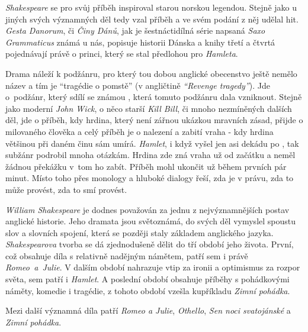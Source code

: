 \documentclass[../main.tex]{subfiles}
\begin{document}
\noindent
\textit{Shakespeare} se pro svůj příběh inspiroval starou norskou legendou.
Stejně jako u jiných svých významných děl tedy vzal příběh a ve svém podání z něj udělal hit.
\textit{Gesta Danorum}, či \textit{Činy Dánů}, jak je šestnáctidílná série napsaná \textit{Saxo Grammaticus} známá u nás, popisuje historii Dánska a knihy třetí a čtvrtá pojednávají právě o princi, který se stal předlohou pro \textit{Hamleta}.

\noindent
Drama náleží k podžánru, pro který tou dobou anglické obecenstvo ještě nemělo název a tím je \enquote{tragédie o pomstě} (v angličtině \textit{\enquote{Revenge tragedy}}).
Jde o~podžánr, který sdílí se známou , která tomuto podžánru dala vzniknout.
Stejně jako moderní \textit{John Wick}, o něco starší \textit{Kill Bill}, či mnoho nezmíněných dalších děl, jde o příběh, kdy hrdina, který není zářnou ukázkou mravních zásad, přijde o milovaného člověka a celý příběh je o nalezení a zabití vraha - kdy hrdina většinou při daném činu sám umírá.
\textit{Hamlet}, i když vyšel jen asi dekádu po , tak subžánr podrobil mnoha otázkám.
Hrdina zde zná vraha už od začátku a neměl žádnou překážku v~tom ho zabít.
Příběh mohl ukončit už během prvních pár minut.
Místo toho přes monology a hluboké dialogy řeší, zda je v právu, zda to může provést, zda to smí provést.



\noindent 
\textit{William Shakespeare} je dodnes považován za jednu z nejvýznamnějších postav anglické historie.
Jeho dramata jsou světoznámá, do svých děl vymyslel spoustu slov a slovních spojení, která se později staly základem anglického jazyka. \\
\textit{Shakespearova} tvorba se dá zjednodušeně dělit do tří období jeho života.
První, což obsahuje díla s relativně nadějným námětem, patří sem i právě \textit{Romeo~a~Julie}.
V dalším období nahrazuje vtip za ironii a optimismus za rozpor světa, sem patří i \textit{Hamlet}.
A poslední období obsahuje příběhy s pohádkovými náměty, komedie i tragédie, z tohoto období vzešla kupříkladu \textit{Zimní pohádka}.

\noindent 
Mezi další významná díla patří \textit{Romeo a Julie}, \textit{Othello}, \textit{Sen noci svatojánské} a \textit{Zimní pohádka}.
\end{document}
